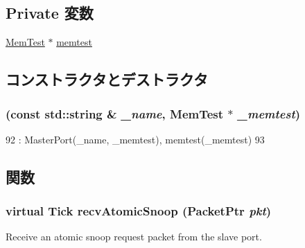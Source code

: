 \subsection*{Private 変数}
\begin{DoxyCompactItemize}
\item 
\hyperlink{classMemTest_1_1MemTest}{MemTest} $\ast$ \hyperlink{classMemTest_1_1CpuPort_a63a1c6b42fdf48654db0e08d90e2bbda}{memtest}
\end{DoxyCompactItemize}


\subsection{コンストラクタとデストラクタ}
\hypertarget{classMemTest_1_1CpuPort_a3ad8d6a0ec1ce0a3d0e90f2a43411b32}{
\subsubsection[{CpuPort}]{ (const std::string \& {\em \_\-name}, \/  {\bf MemTest} $\ast$ {\em \_\-memtest})}}
\label{classMemTest_1_1CpuPort_a3ad8d6a0ec1ce0a3d0e90f2a43411b32}



\begin{DoxyCode}
92             : MasterPort(_name, _memtest), memtest(_memtest)
93         { }
\end{DoxyCode}


\subsection{関数}
\hypertarget{classMemTest_1_1CpuPort_ae1160d8f94f042aba1dc9a07a72e1e82}{
\subsubsection[{recvAtomicSnoop}]{\setlength{\rightskip}{0pt plus 5cm}virtual {\bf Tick} recvAtomicSnoop ({\bf PacketPtr} {\em pkt})}}
\label{classMemTest_1_1CpuPort_ae1160d8f94f042aba1dc9a07a72e1e82}
Receive an atomic snoop request packet from the slave port. 

